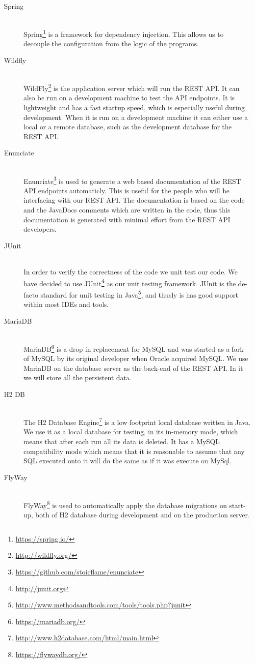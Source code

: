 \begin{description}
    \item[Spring] \hfill \\ 
        Spring\footnote{\url{https://spring.io/}} is a framework for dependency injection. 
        This allows us to decouple the configuration from the logic of the programs. 

    \item[Wildfly] \hfill \\
        WildFly\footnote{\url{http://wildfly.org/}} is the application server which will run the REST API. 
        It can also be run on a development machine to test the API endpoints. 
        It is lightweight and has a fast startup speed, which is especially useful during development. 
        When it is run on a development machine it can either use a local or a remote database, such as the development database for the REST API. 

    \item[Enunciate] \hfill \\
        Enunciate\footnote{\url{https://github.com/stoicflame/enunciate}} is used to generate a web based documentation of the REST API endpoints automaticly. 
        This is useful for the people who will be interfacing with our REST API.
        The documentation is based on the code and the JavaDocs comments which are written in the code, thus this documentation is generated with minimal effort from the REST API developers.

    \item[JUnit] \hfill \\
        In order to verify the correctness of the code we unit test our code. 
        We have decided to use JUnit\footnote{\url{http://junit.org}} as our unit testing framework.
        JUnit is the de-facto standard for unit testing in Java\footnote{\url{http://www.methodsandtools.com/tools/tools.php?junit}}, and thusly is has good support within most IDEs and tools. 

    \item[MariaDB] \hfill \\ 
        MariaDB\footnote{\url{https://mariadb.org/}} is a drop in replacement for MySQL and was started as a fork of MySQL by its original developer when Oracle acquired MySQL.
        We use MariaDB on the database server as the back-end of the REST API.
        In it we will store all the persistent data. 

    \item[H2 DB] \hfill \\
        The H2 Database Engine\footnote{\url{http://www.h2database.com/html/main.html}} is a low footprint local database written in Java. 
        We use it as a local database for testing, in its in-memory mode, which means that after each run all its data is deleted.
        It has a MySQL compatibility mode which means that it is reasonable to assume that any SQL executed onto it will do the same as if it was execute on MySql.

    \item[FlyWay] \hfill \\
        FlyWay\footnote{\url{https://flywaydb.org/}} is used to automatically apply the database migrations on start-up, both of H2 database during development and on the production server.
\end{description}
